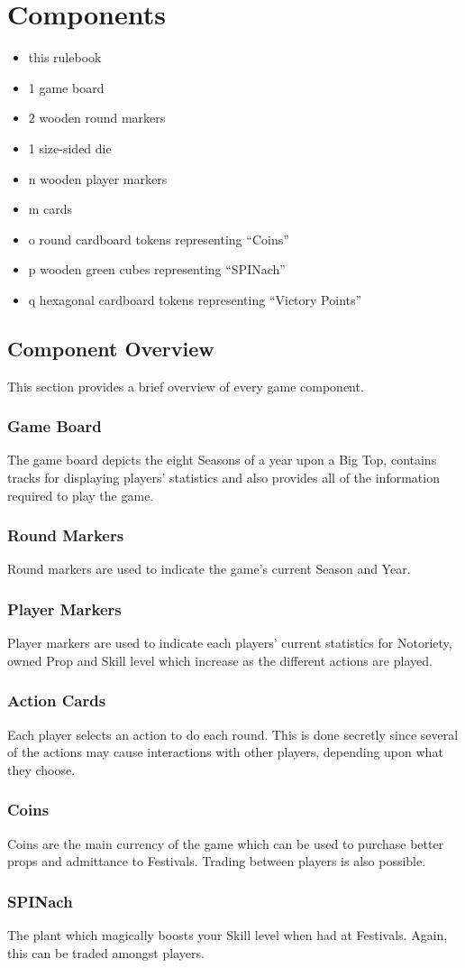 \chapter{Components}
	\begin{itemize}
		\item this rulebook
		\item 1 game board
		\item 2 wooden round markers
		\item 1 size-sided die
		\item n wooden player markers %
		\item m cards %
		\item o round cardboard tokens representing ``Coins''
		\item p wooden green cubes representing ``SPINach''
		\item q hexagonal cardboard tokens representing ``Victory Points''
	\end{itemize}
	\section{Component Overview}
This section provides a brief overview of every game component.
		\subsection{Game Board}
The game board depicts the eight Seasons of a year upon a Big Top, contains tracks for displaying players' statistics and also provides all of the information required to play the game.
		\subsection{Round Markers}
Round markers are used to indicate the game's current Season and Year.
		\subsection{Player Markers}
Player markers are used to indicate each players' current statistics for Notoriety, owned Prop and Skill level which increase as the different actions are played.
		\subsection{Action Cards}
Each player selects an action to do each round. 
This is done secretly since several of the actions may cause interactions with other players, depending upon what they choose.
		\subsection{Coins}
Coins are the main currency of the game which can be used to purchase better props and admittance to Festivals.
Trading between players is also possible.
		\subsection{SPINach}
The plant which magically boosts your Skill level when had at Festivals.
Again, this can be traded amongst players.

